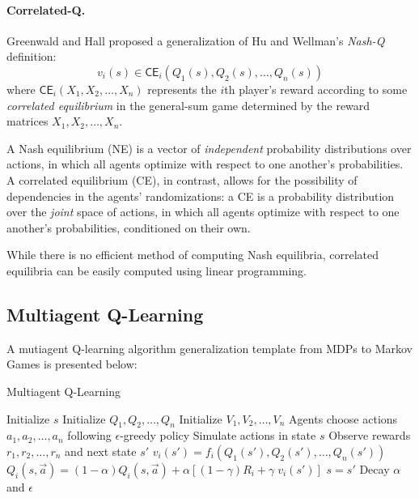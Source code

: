 \documentclass{article}
\begin{document}
    \paragraph{Correlated-Q.}
    Greenwald and Hall proposed a generalization of Hu and Wellman's \emph{Nash-Q} definition:
    \begin{equation}
        v_{i}(s) \in \mathsf{CE}_{i}(Q_{1}(s), Q_{2}(s), \ldots, Q_{n}(s)) \label{eq3}
    \end{equation}
    where $\mathsf{CE}_{i}(X_{1}, X_{2}, \ldots, X_{n})$ represents the $i$th player's reward according to some \emph{correlated equilibrium} in the general-sum game determined by the reward matrices $X_{1}, X_{2}, \ldots, X_{n}$.

    A Nash equilibrium (NE) is a vector of \emph{independent} probability distributions over actions, in which all agents optimize with respect to one another's probabilities.
    A correlated equilibrium (CE), in contrast, allows for the possibility of dependencies in the agents' randomizations: a CE is a probability distribution over the \emph{joint} space of actions, in which all agents optimize with respect to one another's probabilities, conditioned on their own.

    While there is no efficient method of computing Nash equilibria, correlated equilibria can be easily computed using linear programming.

    \subsection{Multiagent Q-Learning}
    \label{subsec:mql}

    A mutiagent Q-learning algorithm generalization template from MDPs to Markov Games is presented below:

    \begin{algorithm}
        \caption{Multiagent Q-Learning}
        \label{alg1}
        \begin{algorithmic}
            \State Initialize $s$
            \State Initialize $Q_{1}, Q_{2}, \ldots, Q_{n}$
            \State Initialize $V_{1}, V_{2}, \ldots, V_{n}$
                \State Agents choose actions $a_{1}, a_{2}, \ldots, a_{n}$ following $\epsilon$-greedy policy
                \State Simulate actions in state $s$
                \State Observe rewards $r_{1}, r_{2}, \ldots, r_{n}$ and next state $s'$
                    \State $v_{i}(s') = f_{i} \left( Q_{1}(s'), Q_{2}(s'), \ldots, Q_{n}(s') \right)$
                    \State $Q_{i}(s, \vec{a}) = (1 - \alpha) Q_{i}(s, \vec{a}) + \alpha \left[(1 - \gamma) R_{i} + \gamma \; v_{i}(s') \right]$
                \EndFor
                \State $s = s'$
                \State Decay $\alpha$ and $\epsilon$
            \EndFor
        \end{algorithmic}
    \end{algorithm}
\end{document}
